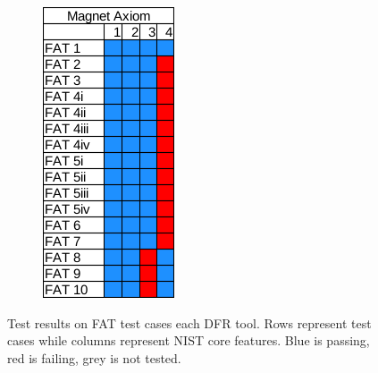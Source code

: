 \begin{figure}
\begin{subfigure}{0.16\linewidth}
    \end{subfigure}
    \begin{subfigure}{0.16\linewidth}
        \includegraphics[width=\linewidth]{fig/axiom_results_fat.png}
    \end{subfigure}
        
    \caption{Test results on FAT test cases each DFR tool. Rows represent test cases while columns represent NIST core features. Blue is passing, red is failing, grey is not tested.}
    \label{fig:results_fat}
\end{figure}

